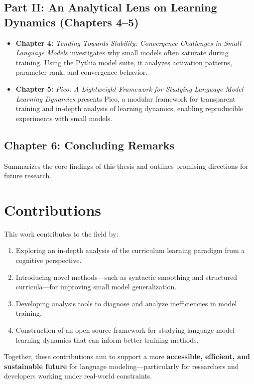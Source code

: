 \subsection*{Part II: An Analytical Lens on Learning Dynamics (Chapters 4–5)}

\begin{itemize}
    \item \textbf{Chapter 4:} \emph{Tending Towards Stability: Convergence Challenges in Small Language Models}  
    investigates why small models often saturate during training. Using the Pythia model suite, it analyzes activation patterns, parameter rank, and convergence behavior.

    \item \textbf{Chapter 5:} \emph{Pico: A Lightweight Framework for Studying Language Model Learning Dynamics}  
    presents Pico, a modular framework for transparent training and in-depth analysis of learning dynamics, enabling reproducible experiments with small models.
\end{itemize}

\subsection*{Chapter 6: Concluding Remarks}

Summarizes the core findings of this thesis and outlines promising directions for future research.

\section*{Contributions}

This work contributes to the field by:

\begin{enumerate}
    \item Exploring an in-depth analysis of the curriculum learning paradigm from a cognitive perspective.

    \item Introducing novel methods—such as syntactic smoothing and structured curricula—for improving small model generalization.

    \item Developing analysis tools to diagnose and analyze inefficiencies in model training.

    \item Construction of an open-source framework for studying language model learning dynamics that can inform better training methods.
\end{enumerate}

Together, these contributions aim to support a more \textbf{accessible, efficient, and sustainable future} for language modeling—particularly for researchers and developers working under real-world constraints.

